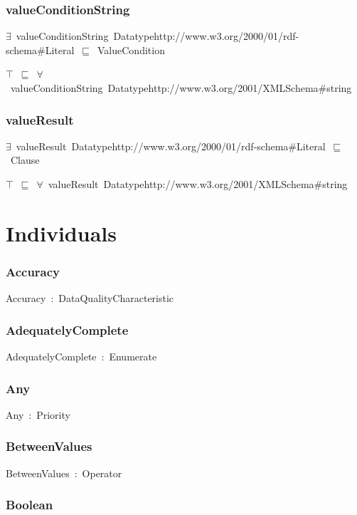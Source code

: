 \documentclass{article}
\begin{document}
\subsubsection*{valueConditionString}

\ensuremath{\exists}~valueConditionString~Datatypehttp://www.w3.org/2000/01/rdf-schema#Literal~\ensuremath{\sqsubseteq}~ValueCondition

\ensuremath{\top}~\ensuremath{\sqsubseteq}~\ensuremath{\forall}~valueConditionString~Datatypehttp://www.w3.org/2001/XMLSchema#string

\subsubsection*{valueResult}

\ensuremath{\exists}~valueResult~Datatypehttp://www.w3.org/2000/01/rdf-schema#Literal~\ensuremath{\sqsubseteq}~Clause

\ensuremath{\top}~\ensuremath{\sqsubseteq}~\ensuremath{\forall}~valueResult~Datatypehttp://www.w3.org/2001/XMLSchema#string

\section*{Individuals}\subsubsection*{Accuracy}

Accuracy~:~DataQualityCharacteristic

\subsubsection*{AdequatelyComplete}

AdequatelyComplete~:~Enumerate

\subsubsection*{Any}

Any~:~Priority

\subsubsection*{BetweenValues}

BetweenValues~:~Operator

\subsubsection*{Boolean}
\end{document}
